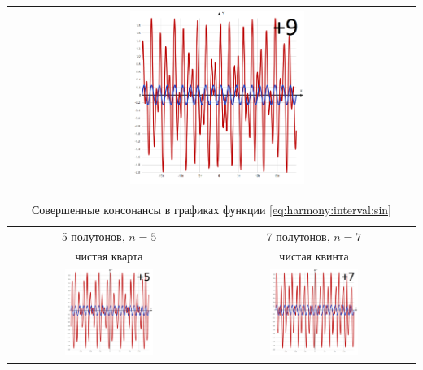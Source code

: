 \begin{table}[!ht]
\begin{tabular}{c|c}
            & \includegraphics[width=0.45\textwidth]{fig/intervals/i09} \\
        \hline\hline
    \end{tabular}
\end{table}

\begin{table}[!ht]
    \caption{Совершенные консонансы в графиках функции \eqref{eq:harmony:interval:sin}}
    \label{t:harmony:interval:conso-5-7}
    \centering
    \begin{tabular}{c|c}
        \hline\hline
        5 полутонов, $n=5$  & 7 полутонов, $n=7$ \\
        чистая кварта       & чистая квинта \\
        \includegraphics[width=0.45\textwidth]{fig/intervals/i05} 
            & \includegraphics[width=0.45\textwidth]{fig/intervals/i07} \\
        \hline\hline
    \end{tabular}
\end{table}

